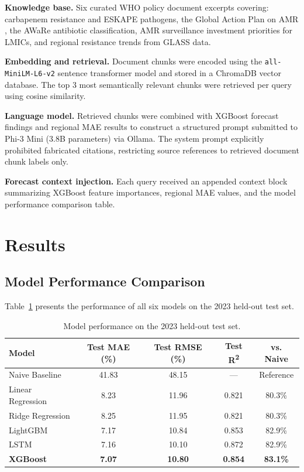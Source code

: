 \documentclass[12pt]{article}
\begin{document}
\textbf{Knowledge base.} Six curated WHO policy document excerpts covering: carbapenem resistance and ESKAPE pathogens, the Global Action Plan on AMR \citep{who2015gap}, the AWaRe antibiotic classification, AMR surveillance investment priorities for LMICs, and regional resistance trends from GLASS data.

\textbf{Embedding and retrieval.} Document chunks were encoded using the \texttt{all-MiniLM-L6-v2} sentence transformer model and stored in a ChromaDB vector database. The top 3 most semantically relevant chunks were retrieved per query using cosine similarity.

\textbf{Language model.} Retrieved chunks were combined with XGBoost forecast findings and regional MAE results to construct a structured prompt submitted to Phi-3 Mini (3.8B parameters) via Ollama. The system prompt explicitly prohibited fabricated citations, restricting source references to retrieved document chunk labels only.

\textbf{Forecast context injection.} Each query received an appended context block summarizing XGBoost feature importances, regional MAE values, and the model performance comparison table.

\section{Results}

\subsection{Model Performance Comparison}

Table~\ref{tab:results} presents the performance of all six models on the 2023 held-out test set.

\begin{table}[H]
\centering
\caption{Model performance on the 2023 held-out test set.}
\label{tab:results}
\begin{tabular}{lcccc}
\toprule
\textbf{Model} & \textbf{Test MAE (\%)} & \textbf{Test RMSE (\%)} & \textbf{Test R\textsuperscript{2}} & \textbf{vs. Naive} \\
\midrule
Naive Baseline       & 41.83 & 48.15 & ---   & Reference \\
Linear Regression    & 8.23  & 11.96 & 0.821 & 80.3\% \\
Ridge Regression     & 8.25  & 11.95 & 0.821 & 80.3\% \\
LightGBM             & 7.17  & 10.84 & 0.853 & 82.9\% \\
LSTM                 & 7.16  & 10.10 & 0.872 & 82.9\% \\
\textbf{XGBoost}     & \textbf{7.07} & \textbf{10.80} & \textbf{0.854} & \textbf{83.1\%} \\
\bottomrule
\end{tabular}
\end{table}
\end{document}
